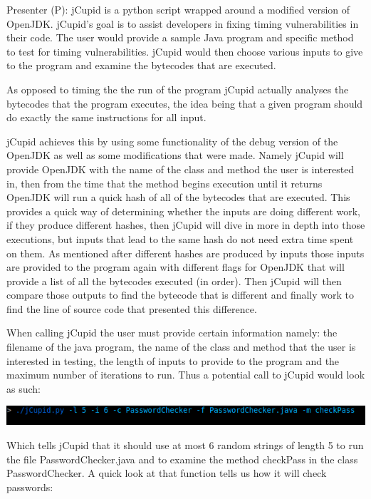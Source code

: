 
Presenter (P): jCupid is a python script wrapped around a modified version of OpenJDK. jCupid's goal
is to assist developers in fixing timing vulnerabilities in their code. The user would provide a sample
Java program and specific method to test for timing vulnerabilities. jCupid would then choose various
inputs to give to the program and examine the bytecodes that are executed.

As opposed to timing the the run of the program jCupid actually analyses the bytecodes that the program
executes, the idea being that a given program should do exactly the same instructions for all input.

jCupid achieves this by using some functionality of the debug version of the OpenJDK as well as some
modifications that were made. Namely jCupid will provide OpenJDK with the name of the class and method
the user is interested in, then from the time that the method begins execution until it returns OpenJDK
will run a quick hash of all of the bytecodes that are executed. This provides a quick way of determining
whether the inputs are doing different work, if they produce different hashes, then jCupid will dive 
in more in depth into those executions, but inputs that lead to the same hash do not need extra time
spent on them. As mentioned after different hashes are produced by inputs those inputs are provided
to the program again with different flags for OpenJDK that will provide a list of all the bytecodes 
executed (in order). Then jCupid will then compare those outputs to find the bytecode that is different
and finally work to find the line of source code that presented this difference.

When calling jCupid the user must provide certain information namely: the filename of the java program,
the name of the class and method that the user is interested in testing, the length of inputs to provide
to the program and the maximum number of iterations to run. Thus a potential call to jCupid would look
as such:

\begin{center}
  \includegraphics[width=\linewidth]{jCupidCall}
\end{center}

Which tells jCupid that it should use at most 6 random strings of length 5 to run the file PasswordChecker.java
and to examine the method checkPass in the class PasswordChecker. A quick look at that function tells us how
it will check passwords:


